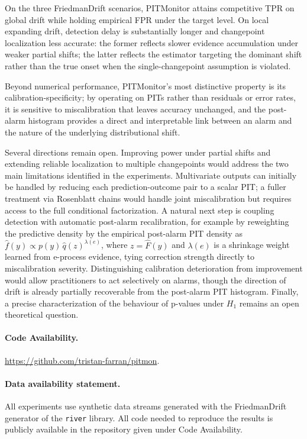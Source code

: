 \documentclass[ejsv2, noshowframe]{imsart}
\theoremstyle{plain}
\theoremstyle{definition}
\theoremstyle{remark}
\begin{document}
On the three FriedmanDrift scenarios, PITMonitor attains competitive TPR on global drift while holding empirical FPR under the target level. On local expanding drift, detection delay is substantially longer and changepoint localization less accurate: the former reflects slower evidence accumulation under weaker partial shifts; the latter reflects the estimator targeting the dominant shift rather than the true onset when the single-changepoint assumption is violated.

Beyond numerical performance, PITMonitor's most distinctive property is its calibration-specificity; by operating on PITs rather than residuals or error rates, it is sensitive to miscalibration that leaves accuracy  unchanged, and the post-alarm histogram provides a direct and interpretable link between an alarm and the nature of the underlying distributional shift.

Several directions remain open. Improving power under partial shifts and extending reliable localization to multiple changepoints would address the two main limitations identified in the experiments. Multivariate outputs can initially be handled by reducing each prediction-outcome pair to a scalar PIT; a fuller treatment via Rosenblatt chains would handle joint miscalibration but requires access to the full conditional factorization. A natural next step is coupling detection with automatic post-alarm recalibration, for example by reweighting the predictive density by the empirical post-alarm PIT density as $\hat{f}(y) \propto p(y)\,\hat{q}(z)^{\lambda(e)}$, where $z = \hat{F}(y)$ and $\lambda(e)$ is a shrinkage weight learned from e-process evidence, tying correction strength directly to miscalibration severity. Distinguishing calibration deterioration from improvement would allow practitioners to act selectively on alarms, though the direction of drift is already partially recoverable from the post-alarm PIT histogram. Finally, a precise characterization of the behaviour of p-values under $H_1$ remains an open theoretical question.

\paragraph{Code Availability.} \url{https://github.com/tristan-farran/pitmon}.

\paragraph{Data availability statement.} All experiments use synthetic data streams generated with the FriedmanDrift generator of the \texttt{river} library. All code needed to reproduce the results is publicly available in the repository given under Code Availability.
\end{document}
